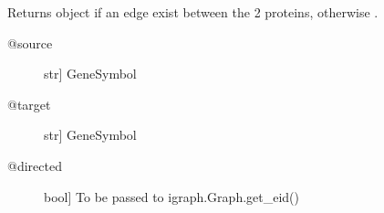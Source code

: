 \documentclass[letterpaper,10pt,english]{sphinxmanual}
\begin{document}
\begin{fulllineitems}
\begin{fulllineitems}
\begin{description}
\end{description}

\end{fulllineitems}


\begin{fulllineitems}
\label{\detokenize{reference:pypath.main.PyPath.gs_affected_by}}
\end{fulllineitems}


\begin{fulllineitems}
\label{\detokenize{reference:pypath.main.PyPath.gs_affects}}
\end{fulllineitems}


\begin{fulllineitems}
\label{\detokenize{reference:pypath.main.PyPath.gs_edge}}
Returns  object if an edge exist between
the 2 proteins, otherwise .
\begin{description}
\item[{@source}] \leavevmode{[}str{]}
GeneSymbol

\item[{@target}] \leavevmode{[}str{]}
GeneSymbol

\item[{@directed}] \leavevmode{[}bool{]}
To be passed to igraph.Graph.get\_eid()

\end{description}

\end{fulllineitems}


\begin{fulllineitems}
\label{\detokenize{reference:pypath.main.PyPath.gs_in_directed}}
\end{fulllineitems}


\end{fulllineitems}
\end{document}
